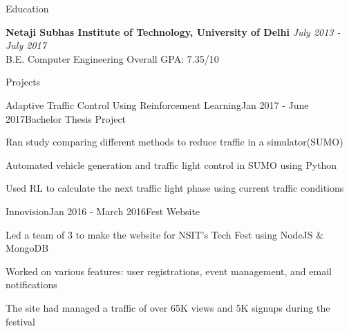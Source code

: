 \documentclass{resume} %
\begin{document}

\begin{rSection}{Education}

{\bf Netaji Subhas Institute of Technology, University of Delhi} \hfill {\em July 2013 - July 2017} 
\\ B.E. Computer Engineering \hfill { Overall GPA: 7.35/10}

\end{rSection}

\begin{rSection}{Projects}

\begin{rSubsection}
{Adaptive Traffic Control Using Reinforcement Learning}{Jan 2017 - June 2017}{Bachelor Thesis Project}{}
\item Ran study comparing different methods to reduce traffic in a simulator(SUMO)
\item Automated vehicle generation and traffic light control in SUMO using Python
\item Used RL to calculate the next traffic light phase using current traffic conditions
\end{rSubsection}

\begin{rSubsection}
{Innovision}{Jan 2016 - March 2016}{Fest Website}{}
\item Led a team of 3 to make the website for NSIT’s Tech Fest using NodeJS & MongoDB
\item Worked on various features: user registrations, event management, and email notifications
\item The site had managed a traffic of over 65K views and 5K signups during the festival
\end{rSubsection}

\end{rSection}
\end{document}
